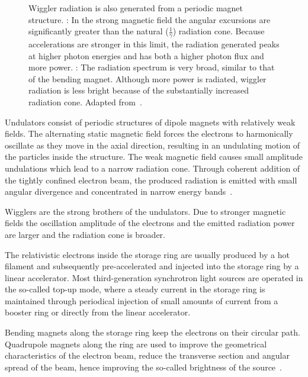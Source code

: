 \begin{figure}%
	\noindent{}
	\caption[Wiggler radiation]{Wiggler radiation is also generated from a periodic magnet structure. %
		: In the strong magnetic field the angular excursions are significantly greater than the natural ($\frac{1}{\gamma}$) radiation cone. Because accelerations are stronger in this limit, the radiation generated peaks at higher photon energies and has both a higher photon flux and more power. %
		: The radiation spectrum is very broad, similar to that of the bending magnet. Although more power is radiated, wiggler radiation is less bright because of the substantially increased radiation cone. Adapted from~\cite{Attwood2007}.}%
	\label{fig:wiggler}
\end{figure}%

Undulators consist of periodic structures of dipole magnets with relatively weak fields. The alternating static magnetic field forces the electrons to harmonically oscillate as they move in the axial direction, resulting in an undulating motion of the particles inside the structure. The weak magnetic field causes small amplitude undulations which lead to a narrow radiation cone. Through coherent addition of the tightly confined electron beam, the produced radiation is emitted with small angular divergence and concentrated in narrow energy bands~\cite{Stampanoni2002a}.

Wigglers are the strong brothers of the undulators. Due to stronger magnetic fields the oscillation amplitude of the electrons and the emitted radiation power are larger and the radiation cone is broader.

The relativistic electrons inside the storage ring are usually produced by a hot filament and subsequently pre-accelerated and injected into the storage ring by a linear accelerator. Most third-generation synchrotron light sources are operated in the so-called top-up mode, where a steady current in the storage ring is maintained through periodical injection of small amounts of current from a booster ring or directly from the linear accelerator. 

Bending magnets along the storage ring keep the electrons on their circular path. Quadrupole magnets along the ring are used to improve the geometrical characteristics of the electron beam, \ie reduce the transverse section and angular spread of the beam, hence improving the so-called brightness of the source~\cite{Margaritondo2002}.

